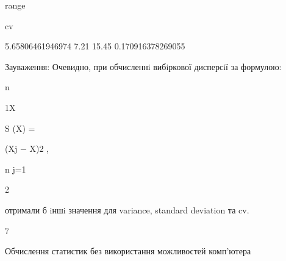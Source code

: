 \documentclass[a4paper,portrait,12pt]{article}
\begin{document}
\begin{flushleft}
range
\end{flushleft}


\begin{flushleft}
cv
\end{flushleft}


5.65806461946974 7.21 15.45 0.170916378269055





\begin{flushleft}
Зауваження: Очевидно, при обчисленнi вибiркової дисперсiї за формулою:
\end{flushleft}


\begin{flushleft}
n
\end{flushleft}





\begin{flushleft}
1X
\end{flushleft}


\begin{flushleft}
S (X) =
\end{flushleft}


\begin{flushleft}
(Xj $-$ X)2 ,
\end{flushleft}


\begin{flushleft}
n j=1
\end{flushleft}


2





\begin{flushleft}
отримали б iншi значення для variance, standard deviation та cv.
\end{flushleft}





7










\begin{flushleft}
Обчислення статистик без використання можливостей комп'ютера
\end{flushleft}
\end{document}
